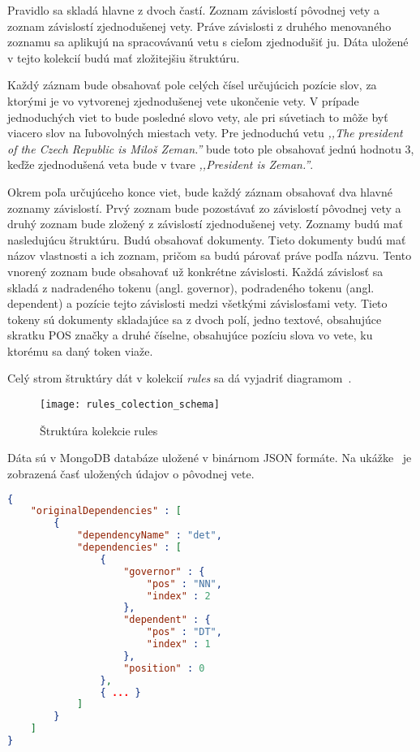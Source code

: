 Pravidlo sa skladá hlavne z dvoch častí. Zoznam závislostí pôvodnej vety a zoznam závislostí zjednodušenej vety. Práve závislosti z druhého menovaného zoznamu sa aplikujú na spracovávanú vetu s cieľom zjednodušiť ju. Dáta uložené v tejto kolekcií budú mať zložitejšiu štruktúru. 

Každý záznam bude obsahovať pole celých čísel určujúcich pozície slov, za ktorými je vo vytvorenej zjednodušenej vete ukončenie vety. V prípade jednoduchých viet to bude posledné slovo vety, ale pri súvetiach to môže byť viacero slov na ľubovolných miestach vety. Pre jednoduchú vetu \textit{,,The president of the Czech Republic is Miloš Zeman.''} bude toto ple obsahovať jednú hodnotu 3, keďže zjednodušená veta bude v tvare \textit{,,President is Zeman.''}.

Okrem poľa určujúceho konce viet, bude každý záznam obsahovať dva hlavné zoznamy závislostí. Prvý zoznam bude pozostávať zo závislostí pôvodnej vety a druhý zoznam bude zložený z závislostí zjednodušenej vety. Zoznamy budú mať nasledujúcu štruktúru. Budú obsahovať dokumenty. Tieto dokumenty budú mať názov vlastnosti a ich zoznam, pričom sa budú párovať práve podľa názvu. Tento vnorený zoznam bude obsahovať už konkrétne závislosti. Každá závislosť sa skladá z nadradeného tokenu (angl. governor), podradeného tokenu (angl. dependent) a pozície tejto závislosti medzi všetkými závislosťami vety. Tieto tokeny sú dokumenty skladajúce sa z dvoch polí, jedno textové, obsahujúce skratku POS značky a druhé číselne, obsahujúce pozíciu slova vo vete, ku ktorému sa daný token viaže.

Celý strom štruktúry dát v kolekcií \textit{rules} sa dá vyjadriť diagramom~.

\begin{figure}[H]
	\begin{center}\texttt{[image: rules\_colection\_schema]}\end{center}
	\caption[Štruktúra kolekcie rules]{Štruktúra kolekcie rules}\label{fig:rules_collection_structure}
\end{figure}

Dáta sú v MongoDB databáze uložené v binárnom JSON formáte. Na ukážke~ je zobrazená časť uložených údajov o pôvodnej vete.

\begin{lstlisting}[language = json, caption={Ukážka dát kolekcie rules}, label = {code:collection_rules_data_example}]
{  
	"originalDependencies" : [  
		{  
			"dependencyName" : "det",
			"dependencies" : [  
				{  
					"governor" : {  
						"pos" : "NN",
						"index" : 2
					},
					"dependent" : {  
						"pos" : "DT",
						"index" : 1
					},
					"position" : 0
				},
				{ ... }
			]
		}
	]
}
\end{lstlisting}

